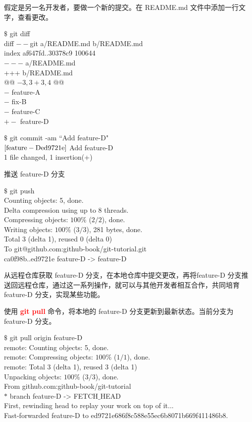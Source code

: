 \documentclass[12pt,a4paper]{article}
\begin{document}
假定是另一名开发者，要做一个新的提交。在 README.md 文件中添加一行文字，查看更改。
\begin{tcolorbox}[colback=green!5,colframe=green!40!black,title= ]
$\$$ git diff \\
diff $--$git a/README.md b/README.md \\
index af647fd..30378c9 100644 \\
$---$ a/README.md \\
+++ b/README.md \\
@@ $-3,3 +3,4$ @@ \\
$-$ feature-A \\
$-$ fix-B \\
$-$ feature-C \\
$+ -$ feature-D 
\end{tcolorbox}
\begin{tcolorbox}[colback=green!5,colframe=green!40!black,title= ]
$\$$ git commit -am ``Add feature-D" \\
$\rm [feature-D ed9721e]$ Add feature-D \\
1 file changed, 1 insertion(+)
\end{tcolorbox}
推送 feature-D 分支
\begin{tcolorbox}[colback=green!5,colframe=green!40!black,title= ]
$\$$ git push \\
Counting objects: 5, done. \\
Delta compression using up to 8 threads. \\
Compressing objects: $100\%$ ($2/2$), done. \\
Writing objects: $100\%$ ($3/3$), 281 bytes, done. \\
Total 3 (delta 1), reused 0 (delta 0) \\
To git@github.com:github-book/git-tutorial.git \\
ca0f98b..ed9721e feature-D -> feature-D 
\end{tcolorbox}
从远程仓库获取 feature-D 分支，在本地仓库中提交更改，再将feature-D 分支推送回远程仓库，通过这一系列操作，就可以与其他开发者相互合作，共同培育 feature-D 分支，实现某些功能。

使用  \textcolor{red}{\bf git pull} 命令，将本地的 feature-D 分支更新到最新状态。当前分支为 feature-D 分支。
\begin{tcolorbox}[colback=green!5,colframe=green!40!black,title= ]
$\$$ git pull origin feature-D \\
remote: Counting objects: 5, done. \\
remote: Compressing objects: $100\%$ ($1/1$), done. \\
remote: Total 3 (delta 1), reused 3 (delta 1) \\
Unpacking objects: $100\%$ ($3/3$), done. \\
From github.com:github-book/git-tutorial \\
$\ast$ branch feature-D -> FETCH$\_$HEAD \\
First, rewinding head to replay your work on top of it... \\
Fast-forwarded feature-D to ed9721e686f8c588e55ec6b8071b669f411486b8. 
\end{tcolorbox}
\end{document}
